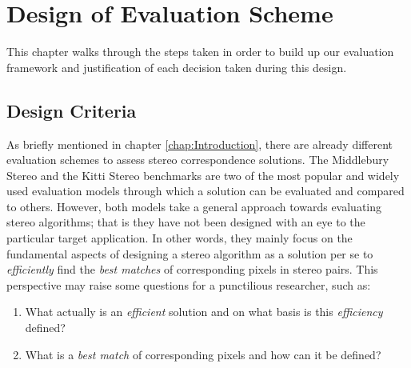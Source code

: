 \chapter{Design of Evaluation Scheme}
\label{chap:System}

This chapter walks through the steps taken in order to build up our evaluation framework and justification of each decision taken during this design.

\section{Design Criteria}

As briefly mentioned in chapter \ref{chap:Introduction}, there are already different evaluation schemes to assess stereo correspondence solutions. The Middlebury Stereo \cite{mideval} and 
the Kitti Stereo benchmarks \cite{kitti} are two of the most popular and widely used evaluation models through which a solution can be evaluated and compared to others.
However, both models take a general approach towards evaluating stereo algorithms; that is they have not been designed with an eye to the particular target 
application.
In other words, they mainly focus on the fundamental aspects of designing a stereo algorithm as a solution per se to \textit{efficiently}
find the \textit{best matches} of corresponding pixels in stereo pairs. 
This perspective may raise some questions for a punctilious researcher, such as:

\begin{enumerate}
\item What actually is an \textit{efficient} solution and on what basis is this \textit{efficiency} defined?
\item What is a \textit{best match} of corresponding pixels and how can it be defined?
\end{enumerate}


